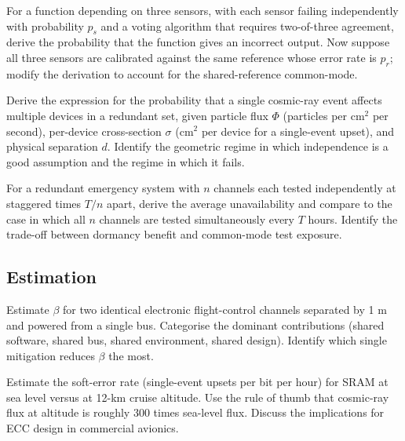 \begin{exercise}
For a function depending on three sensors, with each sensor failing independently with probability $p_s$ and a voting algorithm that requires two-of-three agreement, derive the probability that the function gives an incorrect output. Now suppose all three sensors are calibrated against the same reference whose error rate is $p_r$; modify the derivation to account for the shared-reference common-mode.
\end{exercise}

\begin{exercise}
Derive the expression for the probability that a single cosmic-ray event affects multiple devices in a redundant set, given particle flux $\Phi$ (particles per cm$^2$ per second), per-device cross-section $\sigma$ (cm$^2$ per device for a single-event upset), and physical separation $d$. Identify the geometric regime in which independence is a good assumption and the regime in which it fails.
\end{exercise}

\begin{exercise}
For a redundant emergency system with $n$ channels each tested independently at staggered times $T/n$ apart, derive the average unavailability and compare to the case in which all $n$ channels are tested simultaneously every $T$ hours. Identify the trade-off between dormancy benefit and common-mode test exposure.
\end{exercise}

\subsection*{Estimation}

\begin{exercise}
Estimate $\beta$ for two identical electronic flight-control channels separated by 1 m and powered from a single bus. Categorise the dominant contributions (shared software, shared bus, shared environment, shared design). Identify which single mitigation reduces $\beta$ the most.
\end{exercise}

\begin{exercise}
Estimate the soft-error rate (single-event upsets per bit per hour) for SRAM at sea level versus at 12-km cruise altitude. Use the rule of thumb that cosmic-ray flux at altitude is roughly 300 times sea-level flux. Discuss the implications for ECC design in commercial avionics.
\end{exercise}

